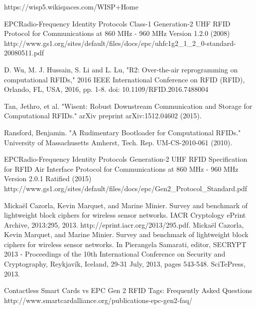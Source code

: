 \documentclass[journal]{IEEEtran}
\begin{document}
%
%
%
\begin{thebibliography}{1}


 https://wisp5.wikispaces.com/WISP+Home

 EPC\texttrademark Radio-Frequency Identity Protocols 
Class-1 Generation-2 UHF RFID
Protocol for Communications at 860 MHz - 960 MHz
Version 1.2.0
(2008)
http://www.gs1.org/sites/default/files/docs/epc/uhfc1g2\_1\_2\_0-standard-20080511.pdf

 D. Wu, M. J. Hussain, S. Li and L. Lu, "R2: Over-the-air reprogramming on computational RFIDs," 2016 IEEE International Conference on RFID (RFID), Orlando, FL, USA, 2016, pp. 1-8.
doi: 10.1109/RFID.2016.7488004

 Tan, Jethro, et al. "Wisent: Robust Downstream Communication and Storage for Computational RFIDs." arXiv preprint arXiv:1512.04602 (2015).

 Ransford, Benjamin. "A Rudimentary Bootloader for Computational RFIDs." University of Massachusetts Amherst, Tech. Rep. UM-CS-2010-061 (2010).

 EPC\texttrademark Radio-Frequency Identity Protocols Generation-2 UHF RFID
Specification for RFID Air Interface
Protocol for Communications at 860 MHz - 960 MHz
Version 2.0.1 Ratified
(2015)
http://www.gs1.org/sites/default/files/docs/epc/Gen2\_Protocol\_Standard.pdf

 Mickaël Cazorla, Kevin Marquet, and Marine Minier. Survey and benchmark of lightweight block ciphers for wireless sensor networks. IACR Cryptology ePrint Archive, 2013:295, 2013. http://eprint.iacr.org/2013/295.pdf.
 Mickaël Cazorla, Kevin Marquet, and Marine Minier. Survey and benchmark of lightweight block ciphers for wireless sensor networks. In Pierangela Samarati, editor, SECRYPT 2013 - Proceedings of the 10th International Conference on Security and Cryptography, Reykjavík, Iceland, 29-31 July, 2013, pages 543-548. SciTePress, 2013.

 Contactless Smart Cards vs EPC Gen 2 RFID Tags: Frequently Asked Questions
http://www.smartcardalliance.org/publications-epc-gen2-faq/

\end{thebibliography}
\end{document}
